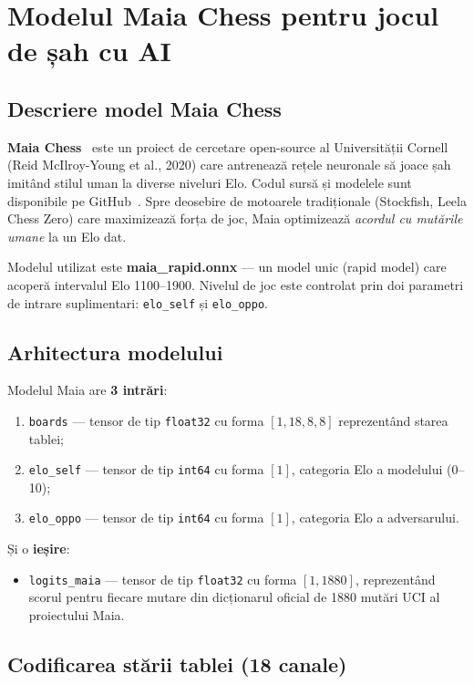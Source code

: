 \documentclass[12pt, a4paper, twoside]{report}
\numberwithin{equation}{section}
\begin{document}
\section{Modelul Maia Chess pentru jocul de șah cu AI}

\subsection{Descriere model Maia Chess}

\textbf{Maia Chess}~\cite{maiacChess} este un proiect de cercetare open-source al Universității Cornell
(Reid McIlroy-Young et al., 2020) care antrenează rețele neuronale să joace șah imitând
stilul uman la diverse niveluri Elo. Codul sursă și modelele sunt disponibile pe
GitHub~\cite{maiaGitHub}. Spre deosebire de motoarele tradiționale (Stockfish,
Leela Chess Zero) care maximizează forța de joc, Maia optimizează \textit{acordul cu
mutările umane} la un Elo dat.

Modelul utilizat este \textbf{maia\_rapid.onnx} — un model unic (rapid model) care
acoperă intervalul Elo 1100–1900. Nivelul de joc este controlat prin doi parametri
de intrare suplimentari: \texttt{elo\_self} și \texttt{elo\_oppo}.

\subsection{Arhitectura modelului}

Modelul Maia are \textbf{3 intrări}:
\begin{enumerate}
  \item \texttt{boards} — tensor de tip \texttt{float32} cu forma $[1, 18, 8, 8]$
    reprezentând starea tablei;
  \item \texttt{elo\_self} — tensor de tip \texttt{int64} cu forma $[1]$, categoria Elo
    a modelului (0–10);
  \item \texttt{elo\_oppo} — tensor de tip \texttt{int64} cu forma $[1]$, categoria Elo
    a adversarului.
\end{enumerate}

Și o \textbf{ieșire}:
\begin{itemize}
  \item \texttt{logits\_maia} — tensor de tip \texttt{float32} cu forma $[1, 1880]$,
    reprezentând scorul pentru fiecare mutare din dicționarul oficial de 1880 mutări
    UCI al proiectului Maia.
\end{itemize}

\subsection{Codificarea stării tablei (18 canale)}
\end{document}
